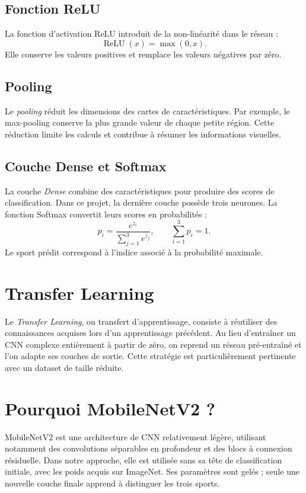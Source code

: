 \documentclass[11pt,a4paper,oneside]{report}
\begin{document}
\subsection{Fonction ReLU}
La fonction d'activation ReLU introduit de la non-linéarité dans le réseau :
\begin{equation}
\operatorname{ReLU}(x)=\max(0,x).
\end{equation}
Elle conserve les valeurs positives et remplace les valeurs négatives par zéro.
\subsection{Pooling}
Le \emph{pooling} réduit les dimensions des cartes de caractéristiques. Par exemple, le max-pooling conserve la plus grande valeur de chaque petite région. Cette réduction limite les calculs et contribue à résumer les informations visuelles.
\subsection{Couche Dense et Softmax}
La couche \emph{Dense} combine des caractéristiques pour produire des scores de classification. Dans ce projet, la dernière couche possède trois neurones. La fonction Softmax convertit leurs scores en probabilités :
\begin{equation}
p_i=\frac{e^{z_i}}{\sum_{j=1}^{3} e^{z_j}},\qquad
\sum_{i=1}^{3}p_i=1.
\end{equation}
Le sport prédit correspond à l'indice associé à la probabilité maximale.
\section{Transfer Learning}
Le \emph{Transfer Learning}, ou transfert d'apprentissage, consiste à réutiliser des connaissances acquises lors d'un apprentissage précédent. Au lieu d'entraîner un CNN complexe entièrement à partir de zéro, on reprend un réseau pré-entraîné et l'on adapte ses couches de sortie. Cette stratégie est particulièrement pertinente avec un dataset de taille réduite.
\section{Pourquoi MobileNetV2 ?}
MobileNetV2 est une architecture de CNN relativement légère, utilisant notamment des convolutions séparables en profondeur et des blocs à connexion résiduelle. Dans notre approche, elle est utilisée sans sa tête de classification initiale, avec les poids acquis sur ImageNet. Ses paramètres sont gelés ; seule une nouvelle couche finale apprend à distinguer les trois sports.
\end{document}

